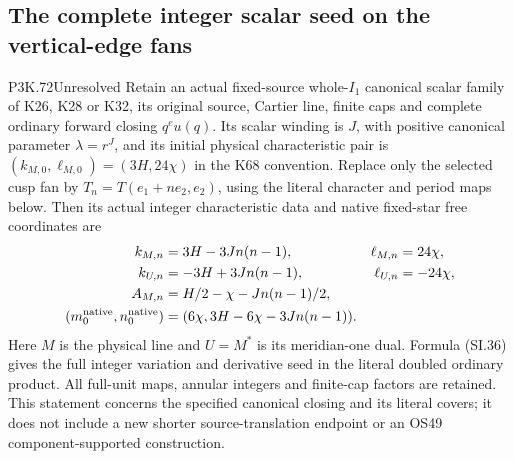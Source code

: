 \subsection{The complete integer scalar seed on the vertical-edge fans}
\begin{statement}{P3K.72}{Unresolved}
Retain an actual fixed-source whole-\(I_1\) canonical scalar family
of K26, K28 or K32, its original source, Cartier line, finite caps and
complete ordinary forward closing \(q^e u(q)\). Its scalar winding is
\(J\), with positive canonical parameter \(\lambda=r^J\), and its
initial physical characteristic pair is
\((k_{M,0},\ell_{M,0})=(3H,24\chi)\) in the K68 convention.
Replace only the selected cusp fan by
\(T_n=T(e_1+ne_2,e_2)\), using the literal character and period maps
below. Then its actual integer characteristic data and native fixed-star
free coordinates are
\[
\begin{aligned}
k_{M,n}&=3H-3Jn(n-1),&\ell_{M,n}&=24\chi,\\
k_{U,n}&=-3H+3Jn(n-1),&\ell_{U,n}&=-24\chi,\\
A_{M,n}&=H/2-\chi-Jn(n-1)/2,\\
(m_0^{\rm native},n_0^{\rm native})
  &=(6\chi,3H-6\chi-3Jn(n-1)).
\end{aligned}
\]
Here \(M\) is the physical line and \(U=M^*\) is its meridian-one
dual. Formula (SI.36) gives the full integer variation and derivative
seed in the literal doubled ordinary product. All full-unit maps,
annular integers and finite-cap factors are retained. This statement
concerns the specified canonical closing and its literal covers; it
does not include a new shorter source-translation endpoint or an OS49
component-supported construction.
\end{statement}
